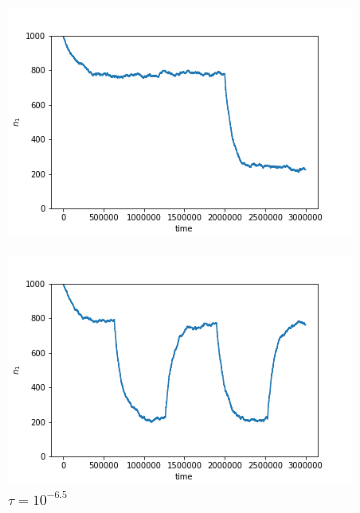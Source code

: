 \documentclass{article}
\begin{document}
\begin{figure}[h]
	\centering
	\begin{subfigure}[t]{0.24\linewidth}
		\centering
		\includegraphics[width = 1.0\linewidth, trim={0 0 0 0}, clip=true]{figures/tau5e7_selection_trajec.png}
		\label{fig:t7}	
	\end{subfigure}
	\hspace{0.01\linewidth}
	\begin{subfigure}[t]{0.24\linewidth}
		\centering
		\includegraphics[width = 1.0\linewidth, trim={0 0 0 0}, clip=true]{figures/tau5e5_selection_trajec.png}
		\caption{$\tau = 10^{-6.5}$}
		\label{fig:t65}
	\end{subfigure}
	\begin{subfigure}[t]{0.24\linewidth}
		\centering

\end{subfigure}
\end{figure}
\end{document}

